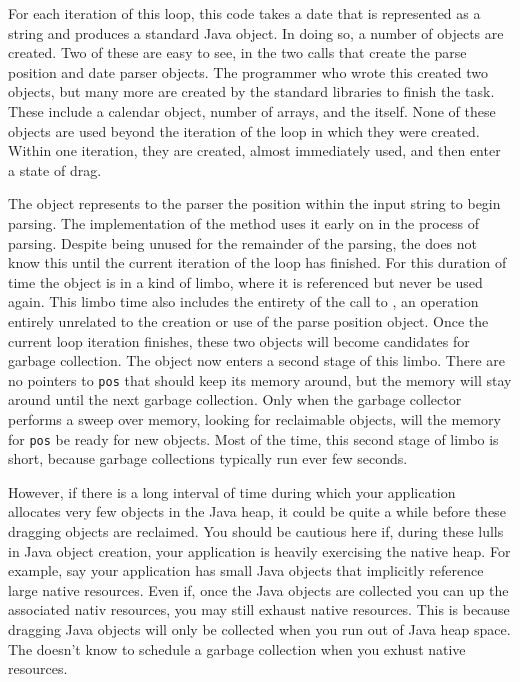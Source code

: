 For each iteration of this loop, this code takes a date that is represented as a
string and produces a standard Java  object. In doing so, a number of
objects are created. Two of these are easy to see, in the two  calls
that create the parse position and date parser objects. The programmer who wrote
this created two objects, but many more are created by the standard libraries to
finish the task. These include a calendar object, number of arrays, and the
 itself. None of these objects are used beyond the iteration of the
loop in which they were created. Within one iteration, they are created, almost
immediately used, and then enter a state of drag.


The  object represents to the parser the position within the input
string to begin parsing. The implementation of the  method uses it
early on in the process of parsing. Despite being unused for the remainder of the
parsing, the \jre does not know this until the current iteration of the loop has
finished. For this duration of time the object is in a kind of limbo, where it is
referenced but never be used again. This limbo time also includes the entirety of
the call to , an operation entirely unrelated to the
creation or use of the parse position object. Once the current loop iteration
finishes, these two objects will become candidates for garbage collection.
The object now enters a second stage of this limbo. There are no pointers to
{\tt pos} that should keep its memory around, but the memory will stay around
until the next garbage collection.
Only when the garbage collector performs a sweep over memory, looking
for reclaimable objects, will the memory for {\tt pos} be ready for new objects.
Most of the time, this second stage of limbo is short, because garbage
collections typically run ever few seconds.

However, if there is a long interval
of time during which your application allocates very few objects in the Java
heap, it could be quite a while before these dragging objects are reclaimed. You
should be cautious here if, during these lulls in Java object creation, your
application is heavily exercising the native heap. For example, say your
application has small Java objects that implicitly reference large native
resources. Even if, once the Java objects are collected you can up the
associated nativ resources, you may still exhaust native resources. This is
because dragging Java objects will only be collected when you run out of Java
heap space. The \jre doesn't know to schedule a garbage collection when you
exhust native resources.


